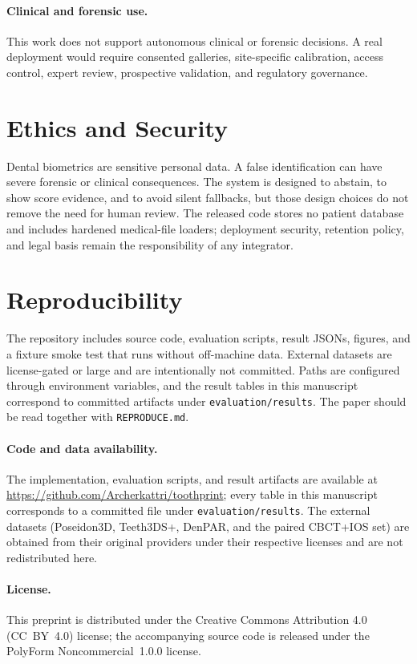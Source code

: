 \documentclass[10pt,twocolumn]{article}
\begin{document}
\paragraph{Clinical and forensic use.}
This work does not support autonomous clinical or forensic decisions. A real deployment would require consented galleries, site-specific calibration, access control, expert review, prospective validation, and regulatory governance.

\section{Ethics and Security}
Dental biometrics are sensitive personal data. A false identification can have severe forensic or clinical consequences. The system is designed to abstain, to show score evidence, and to avoid silent fallbacks, but those design choices do not remove the need for human review. The released code stores no patient database and includes hardened medical-file loaders; deployment security, retention policy, and legal basis remain the responsibility of any integrator.

\section{Reproducibility}
The repository includes source code, evaluation scripts, result JSONs, figures, and a fixture smoke test that runs without off-machine data. External datasets are license-gated or large and are intentionally not committed. Paths are configured through environment variables, and the result tables in this manuscript correspond to committed artifacts under \texttt{evaluation/results}. The paper should be read together with \texttt{REPRODUCE.md}.

\paragraph{Code and data availability.}
The implementation, evaluation scripts, and result artifacts are available at \url{https://github.com/Archerkattri/toothprint}; every table in this manuscript corresponds to a committed file under \texttt{evaluation/results}. The external datasets (Poseidon3D, Teeth3DS+, DenPAR, and the paired CBCT+IOS set) are obtained from their original providers under their respective licenses and are not redistributed here.

\paragraph{License.}
This preprint is distributed under the Creative Commons Attribution 4.0 (CC~BY~4.0) license; the accompanying source code is released under the PolyForm Noncommercial~1.0.0 license.
\end{document}
